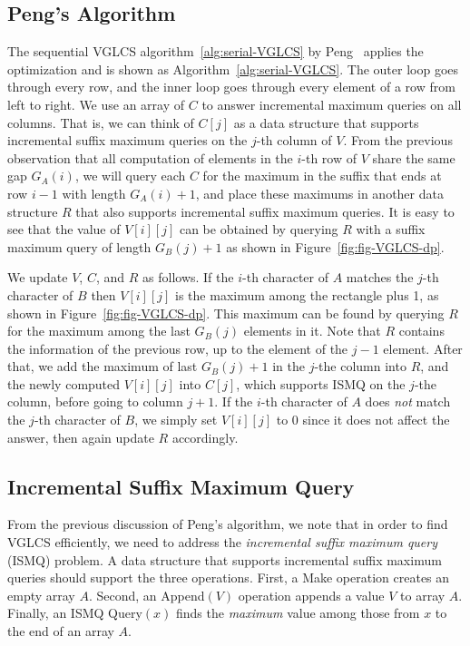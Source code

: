 \subsection{Peng's Algorithm}

The sequential VGLCS algorithm~\ref{alg:serial-VGLCS} by
Peng~\cite{Peng2011TheLC} applies the optimization and is shown as
Algorithm~\ref{alg:serial-VGLCS}.  The outer loop goes through every
row, and the inner loop goes through every element of a row from left to
right.  We use an array of $C$ to answer incremental maximum queries on
all columns.  That is, we can think of $C[j]$ as a data structure that
supports incremental suffix maximum queries on the $j$-th column of $V$.
From the previous observation that all computation of elements in the
$i$-th row of $V$ share the same gap $G_A(i)$, we will query each $C$
for the maximum in the suffix that ends at row $i-1$ with length
$G_A(i)+1$, and place these maximums in another data structure $R$ that
also supports incremental suffix maximum queries.  It is easy to see
that the value of $V[i][j]$ can be obtained by querying $R$ with a
suffix maximum query of length $G_B(j)+1$ as shown in
Figure~\ref{fig:fig-VGLCS-dp}.

We update $V$, $C$, and $R$ as follows.  If the $i$-th character of $A$
matches the $j$-th character of $B$ then $V[i][j]$ is the maximum among
the rectangle plus 1, as shown in Figure~\ref{fig:fig-VGLCS-dp}. This
maximum can be found by querying $R$ for the maximum among the last
$G_B(j)$ elements in it.  Note that $R$ contains the information of the
previous row, up to the element of the $j-1$ element.  After that, we
add the maximum of last $G_B(j)+1$ in the $j$-the column into $R$, and
the newly computed $V[i][j]$ into $C[j]$, which supports ISMQ on the
$j$-the column, before going to column $j+1$.  If the $i$-th character
of $A$ does {\em not} match the $j$-th character of $B$, we simply set
$V[i][j]$ to 0 since it does not affect the answer, then again update
$R$ accordingly.
 
 


\subsection{Incremental Suffix Maximum Query}

From the previous discussion of Peng's algorithm, we note that in order
to find VGLCS efficiently, we need to address the {\em incremental
suffix maximum query} (ISMQ) problem.  A data structure that supports
incremental suffix maximum queries should support the three operations.
First, a {\sc Make} operation creates an empty array $A$. Second, an
{\sc Append}$(V)$ operation appends a value $V$ to array $A$. Finally, an
ISMQ {\sc Query}$(x)$ finds the {\em maximum} value among those from $x$
to the end of an array $A$.

